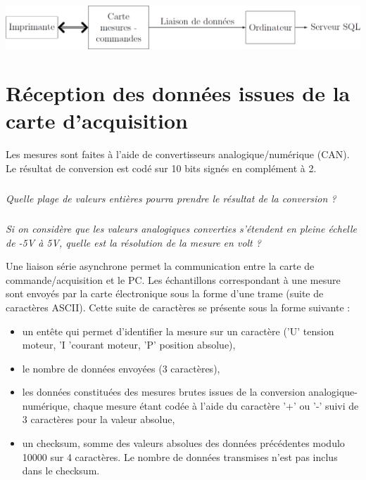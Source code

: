 \documentclass[10pt]{article}
\newif\ifprof
\begin{document}
\begin{center}
\includegraphics[width=.75\textwidth]{images/fig_01}
\end{center}



\section{Réception des données issues de la carte d'acquisition}

Les mesures sont faites à l'aide de convertisseurs analogique/numérique (CAN). Le résultat
de conversion est codé sur 10 bits signés en complément à 2.

\subparagraph{}
\textit{Quelle plage de valeurs entières pourra prendre le résultat de la conversion ?}
\ifprof
\begin{corrige}
Dans le cas de 10 bits signés complémentés à 2, il y a un bit de signe et 9 bits de valeurs. On peut donc coder $2^{10} = 1024$  valeurs s'étendant de $-2^9 = -512$ à $2^9-1=511$.
\end{corrige}

\else
\fi

\subparagraph{}
\textit{Si on considère que les valeurs analogiques converties s'étendent en pleine échelle de -5V à
5V, quelle est la résolution de la mesure en volt ?}


\ifprof
\begin{corrige}
Si on doit coder 1024 valeurs sur une échelle de -5 à 5V, la résolution est donc de $10/1024\simeq 9,76 \; \text{mV}$.
\end{corrige}
\else
\fi

Une liaison série asynchrone permet la communication entre la carte de commande/acquisition et le PC. Les échantillons correspondant à une mesure sont envoyés par la carte électronique
sous la forme d'une trame (suite de caractères ASCII). Cette suite de caractères se présente
sous la forme suivante :
\begin{itemize}
\item un entête qui permet d'identifier la mesure sur un caractère ('U' tension moteur, 'I 'courant
moteur, 'P' position absolue),
\item le nombre de données envoyées (3 caractères),
\item les données constituées des mesures brutes issues de la conversion analogique-numérique,
chaque mesure étant codée à l'aide du caractère '+' ou '-' suivi de 3 caractères pour la valeur absolue,
\item un checksum, somme des valeurs absolues des données précédentes modulo 10000 sur 4
caractères. Le nombre de données transmises n'est pas inclus dans le checksum.
\end{itemize}
\end{document}
